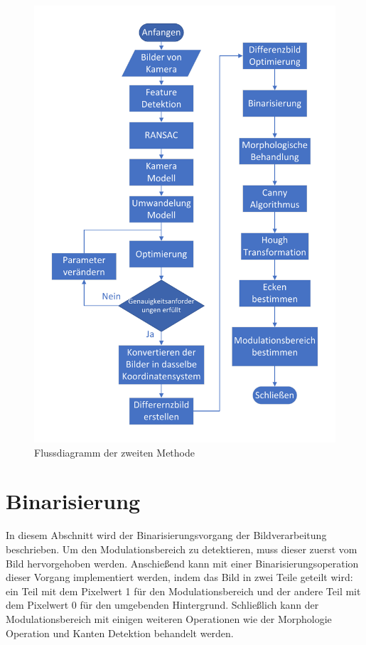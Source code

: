 \begin{figure}[H]
 \centering 
 \includegraphics[keepaspectratio,width=1.0\textwidth]{images/4_ZweiteErfahrung/Flussdiagrammsum.pdf}
 \caption{Flussdiagramm der zweiten Methode}
 \label{fig:Flussdiagramm der zweite Methode}
\end{figure}

\section{Binarisierung}

In diesem Abschnitt wird der Binarisierungsvorgang der Bildverarbeitung beschrieben. Um den Modulationsbereich zu detektieren, muss dieser zuerst vom Bild hervorgehoben werden. Anschießend kann mit einer Binarisierungsoperation dieser Vorgang implementiert werden, indem das Bild in zwei Teile geteilt wird: ein Teil mit dem Pixelwert 1 für den Modulationsbereich und der andere Teil mit dem Pixelwert 0 für den umgebenden Hintergrund. Schließlich kann der Modulationsbereich mit einigen weiteren Operationen wie der Morphologie Operation und Kanten Detektion behandelt werden.

